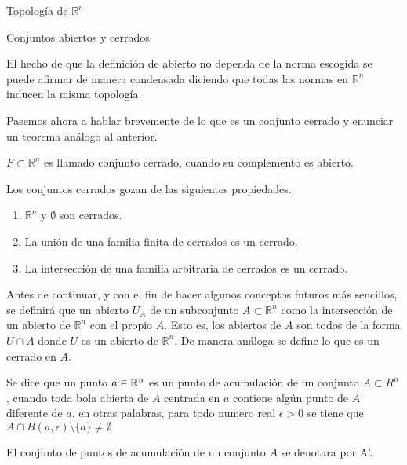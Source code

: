 \begin{chapter}{Topología de $\mathbb{R}^n$}
\begin{section}{Conjuntos abiertos y cerrados}
\begin{them}
\end{them}

El hecho de que la definición de abierto no dependa de la norma escogida se puede afirmar de manera condensada diciendo que todas las normas en $\mathbb{R}^n$ inducen la misma topología.

Pasemos ahora a hablar brevemente de lo que es un conjunto cerrado y enunciar un teorema análogo al anterior.

\begin{defn}

$F \subset \mathbb{R}^n$ es llamado conjunto cerrado, cuando su complemento es abierto.

\end{defn}

\begin{them}

Los conjuntos cerrados gozan de las siguientes propiedades.

\begin{enumerate}
    \item $\mathbb{R}^n$ y $\emptyset$ son cerrados.
    \item La unión de una familia finita de cerrados es un cerrado.
    \item La intersección de una familia arbitraria de cerrados es un cerrado.
\end{enumerate}
\end{them}

Antes de continuar, y con el fin de hacer algunos conceptos futuros más sencillos, se definirá que un abierto $U_A$ de un subconjunto $A \subset \mathbb{R}^n$ como la intersección de un abierto de $\mathbb{R}^n$ con el propio $A$. Esto es, los abiertos de $A$ son todos de la forma $U \cap A$ donde $U$ es un abierto de $\mathbb{R}^n$. De manera análoga se define lo que es un cerrado en $A$.

\begin{defn}
Se dice que un punto $a \in \mathbb{R}^n$ es un punto de acumulación de un conjunto $A \subset R^n$, cuando toda bola abierta de $A$ centrada en $a$ contiene algún punto de $A$ diferente de $a$, en otras palabras, para todo numero real $\epsilon > 0$ se tiene que $A \cap B(a, \epsilon) \setminus \{a\} \neq \emptyset$
\end{defn}

\begin{notn}
El conjunto de puntos de acumulación de un conjunto $A$ se denotara por A'.
\end{notn}


\end{section}
\end{chapter}
